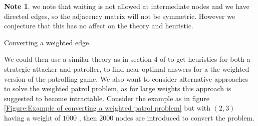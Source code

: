 \documentclass[a4paper,10pt]{article}
\theoremstyle{definition}
\theoremstyle{definition}
\theoremstyle{remark}
\theoremstyle{definition}
\newtheorem*{note}{Note}
\begin{document}
\begin{note} 
we note that waiting is not allowed at intermediate nodes and we have directed edges, so the adjacency matrix will not be symmetric. However we conjecture that this has no affect on the theory and heuristic.
\end{note}

\begin{myfigure}
\begin{center}
\end{center}
\caption{Converting a weighted edge.}
\label{Figure:Example of converting a weighted patrol problem}
\end{myfigure}

We could then use a similar theory as in section 4 of \cite{Lin2013} to get heuristics for both a strategic attacker and patroller, to find near optimal answers for a the weighted version of the patrolling game. We also want to consider alternative approaches to solve the weighted patrol problem, as for large weights this approach is suggested to become intractable. Consider the example as in figure \ref{Figure:Example of converting a weighted patrol problem} but with $(2,3)$ having a weight of $1000$ , then $2000$ nodes are introduced to convert the problem.
\end{document}
